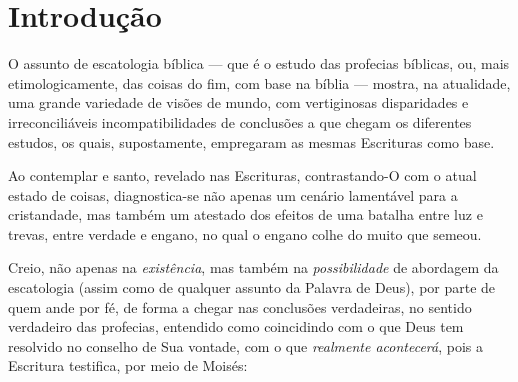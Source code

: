 \setlength{\parskip}{0.5\baselineskip}



\section{Introdução}

    O assunto de escatologia bíblica --- que é o estudo das profecias bíblicas, ou, mais etimologicamente, das  coisas  do  fim,
    com base na bíblia --- mostra, na atualidade, uma grande variedade de visões  de  mundo,  com  vertiginosas  disparidades  e
    irreconciliáveis incompatibilidades de conclusões a que chegam os diferentes estudos, os quais, supostamente, empregaram  as
    mesmas Escrituras como base.

    Ao contemplar  e santo, revelado  nas  Escrituras,  contrastando-O  com  o
    atual estado de coisas, di\-a\-gnos\-ti\-ca-se não apenas um cenário lamentável para a cristandade, mas também  um  atestado
    dos efeitos de uma batalha entre luz e trevas, entre verdade e engano, no qual o engano colhe do muito que semeou.

    Creio, não apenas na \emph{existência}, mas também na \emph{possibilidade}  de  abordagem  da  escatologia  (assim  como  de
    qualquer assunto da Palavra de Deus), por parte de quem ande por fé, de  forma  a  chegar  nas  conclusões  verdadeiras,  no
    sentido verdadeiro das profecias, entendido como coincidindo com o que Deus tem resolvido no conselho de Sua vontade, com  o
    que \emph{realmente acontecerá}, pois a Escritura testifica, por meio de Moisés:


